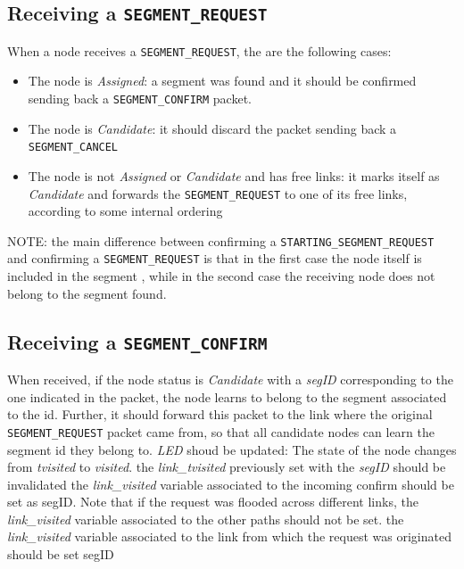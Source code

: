 \subsection{Receiving a \texttt{SEGMENT\_REQUEST}}
When a node receives a \texttt{SEGMENT\_REQUEST}, the are the following cases:

\begin{itemize}
\item The node is \emph{Assigned}: a segment was
found and it should be confirmed sending back a \texttt{SEGMENT\_CONFIRM}
packet.  
\item The node is \emph{Candidate}: it should discard the packet sending
back a \texttt{SEGMENT\_CANCEL} 
\item The node is not \emph{Assigned} or \emph{Candidate} and has free
links: it marks itself as \emph{Candidate} and forwards the \texttt{SEGMENT\_REQUEST}
to one of its free links, according to some internal ordering
\end{itemize}

NOTE: the main difference between confirming a \texttt{STARTING\_SEGMENT\_REQUEST}
and confirming a \texttt{SEGMENT\_REQUEST} is that in the first case the node
itself is included in the segment , while in the second case the
receiving node does not belong to the segment found. 


\subsection{Receiving a \texttt{SEGMENT\_CONFIRM}}
When received, if the node status is \emph{Candidate} with a \emph{segID} corresponding to the one indicated in
the packet, the node learns to belong to the segment associated to the
id. Further, it should forward this packet to the link where the
original \texttt{SEGMENT\_REQUEST} packet came from, so that all candidate nodes
can learn the segment id they belong to.  \emph{LED} shoud be
updated: The state of the node changes from \emph{tvisited} to \emph{visited}.  the
\emph{link\_tvisited} previously set with the \emph{segID} should be invalidated the
\emph{link\_visited} variable associated to the incoming confirm should be set
as segID. Note that if the request was flooded across different links,
the \emph{link\_visited} variable associated to the other paths should not be
set.  the \emph{link\_visited} variable associated to the link from which the
request was originated should be set segID

